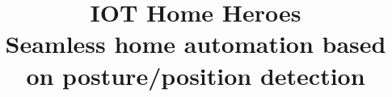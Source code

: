 \documentclass[11pt, conference]{IEEEtran}
\begin{document}
\newcommand{\addImageFull}[2]{
    \begin{figure}[ht]
        \begin{center}
            \texttt{[image: \#1]}
            \caption{#2} %
            \renewcommand{\thefigure}{\thesubsection.\arabic{figure}}
        \end{center}
    \end{figure}
}

\newcommand{\addImageSize}[3]{
    \begin{figure}[ht]
        \begin{center}
            \texttt{[image: \#2]}
            \caption{#3} %
            \renewcommand{\thefigure}{\thesubsection.\arabic{figure}}
        \end{center}
    \end{figure}
}

\setcounter{figure}{0}

\title{IOT Home Heroes\\
\small{Seamless home automation based on posture/position detection\\}
}

\makeatletter
\newcommand{\linebreakand}{
  \end{@IEEEauthorhalign}
  \hfill\mbox{}\par
  \mbox{}\hfill\begin{@IEEEauthorhalign}
}
\makeatother
\end{document}
